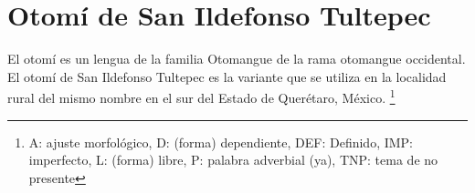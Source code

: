 \section*{Otomí de San Ildefonso Tultepec}

\noindent El otomí es un lengua de la familia Otomangue de la rama otomangue occidental. El otomí de San Ildefonso Tultepec es la variante que se utiliza en la localidad rural del mismo nombre en el sur del Estado de Querétaro, México.
\footnote{A: ajuste morfológico, D: (forma) dependiente, DEF: Definido, IMP: imperfecto, L: (forma) libre, P: palabra adverbial (ya), TNP: tema de no presente}
\vspace{0.5cm}

